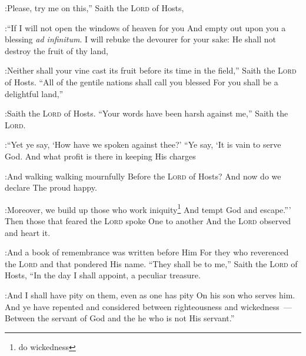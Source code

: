 \begin{enumerate}[align=center]
:Please, try me on this,'' Saith the \textsc{Lord} of Hosts,%

:``If I will not open the windows of heaven for you And empty out upon you a blessing \emph{ad infinitum}.%
     I will rebuke the devourer for your sake: He shall not destroy the fruit of thy land,%

:Neither shall your vine cast its fruit before its time in the field,'' Saith the \textsc{Lord} of Hosts.%
     ``All of the gentile nations shall call you blessed For you shall be a delightful land,''%

:Saith the \textsc{Lord} of Hosts.%
     ``Your words have been harsh against me,'' Saith the \textsc{Lord}.%

:``Yet ye say, `How have we spoken against thee?'%
     ``Ye say, `It is vain to serve God. And what profit is there in keeping His charges%

:And walking walking mournfully Before the \textsc{Lord} of Hosts?%
     And now do we declare The proud happy.%

:Moreover, we build up those who work iniquity\footnote{do wickedness} And tempt God and escape.'''%
     Then those that feared the \textsc{Lord} spoke One to another And the \textsc{Lord} observed and heart it.%

:And a book of remembrance was written before Him For they who reverenced the \textsc{Lord} and that pondered His name.%
     ``They shall be to me,'' Saith the \textsc{Lord} of Hosts, ``In the day I shall appoint, a peculiar treasure.%

:And I shall have pity on them, even as one has pity On his son who serves him.%
     And ye have repented and considered between righteousness and wickedness~--- Between the servant of God and the he who is not His servant.''%
\end{enumerate}
